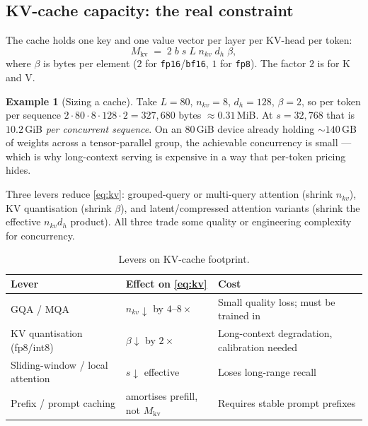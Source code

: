 \documentclass[11pt,twoside,openright]{book}
\theoremstyle{definition}
\newtheorem{example}{Example}[chapter]
\theoremstyle{plain}
\theoremstyle{remark}
\newcommand{\code}[1]{\texttt{\small #1}}
\begin{document}
\subsection{KV-cache capacity: the real constraint}

The cache holds one key and one value vector per layer per KV-head per token:
\begin{equation}
  M_{\text{kv}} \;=\; 2 \; b \; s \; L \; n_{kv} \; d_h \; \beta ,
\label{eq:kv}
\end{equation}
where $\beta$ is bytes per element ($2$ for \code{fp16}/\code{bf16}, $1$ for
\code{fp8}). The factor $2$ is for K and V.

\begin{example}[Sizing a cache]
Take $L=80$, $n_{kv}=8$, $d_h=128$, $\beta=2$, so per token per sequence
$2\cdot 80\cdot 8\cdot 128\cdot 2 = 327{,}680$ bytes $\approx 0.31$\,MiB.
At $s = 32{,}768$ that is $10.2$\,GiB \emph{per concurrent sequence}. On an
80\,GiB device already holding $\sim\!140$\,GB of weights across a tensor-\allowbreak parallel
group, the achievable concurrency is small --- which is why long-context serving
is expensive in a way that per-token pricing hides.
\end{example}

Three levers reduce \eqref{eq:kv}: grouped-query or multi-query attention
(shrink $n_{kv}$), KV quantisation (shrink $\beta$), and latent/compressed
attention variants (shrink the effective $n_{kv}d_h$ product). All three trade
some quality or engineering complexity for concurrency.

\begin{table}[H]
\centering\small
\renewcommand{\arraystretch}{1.3}
\begin{tabularx}{\textwidth}{@{}l l X@{}}
\toprule
\textbf{Lever} & \textbf{Effect on \eqref{eq:kv}} & \textbf{Cost} \\
\midrule
GQA / MQA & $n_{kv} \!\downarrow$ by $4$--$8\times$ & Small quality loss; must be trained in \\
KV quantisation (fp8/int8) & $\beta \!\downarrow$ by $2\times$ & Long-context degradation, calibration needed \\
Sliding-window / local attention & $s \!\downarrow$ effective & Loses long-range recall \\
Prefix / prompt caching & amortises prefill, not $M_{\text{kv}}$ & Requires stable prompt prefixes \\
\bottomrule
\end{tabularx}
\caption{Levers on KV-cache footprint.}
\end{table}
\end{document}
